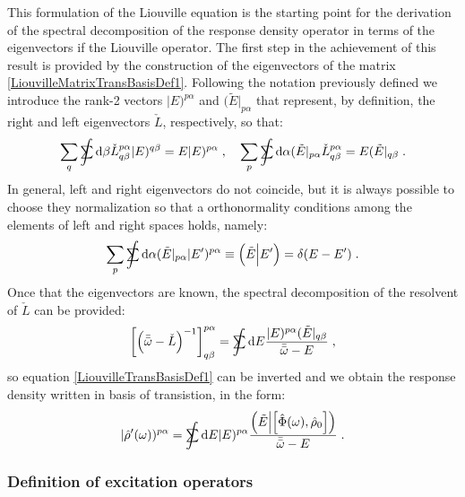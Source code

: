 \documentclass[a4paper]{article}
\newcommand{\dd}{{\rm d}}
\newcommand{\bbomega}{{\bar{\bar\omega}}}
\newcommand{\sint}{\mathrlap{\displaystyle\int}
\mathrlap{\textstyle\sum}
\phantom{\mathrlap{\displaystyle
\int}\textstyle\sum}}
\newcommand{\be}{\begin{equation}}
\newcommand{\ee}{\end{equation}}
\newcommand{\lb}{\label}
\newcommand{\op}[1]{\hat {#1}}
\newcommand{\commutator}[2]{\left[ {#1} , {#2} \right]}
\newcommand{\optr}[1]{\check #1}
\newcommand{\sket}[2]{| #2)^{#1}}
\newcommand{\sbra}[2]{( #2|_{#1}}
\newcommand{\dket}[1]{\Bigl| #1 \Bigr)}
\newcommand{\dbraket}[2]{\Bigl(#1 \Bigl| #2 \Bigr)}
\newcommand{\dmnot}{\op{\rho}_0}
\newcommand{\dm}{\op{\rho}}
\begin{document}
This formulation of the Liouville equation is the starting point for the derivation of the spectral decomposition of the response density operator
in terms of the eigenvectors if the Liouville operator. 
The first step in the achievement of this result is provided by the construction of the eigenvectors of the matrix \eqref{LiouvilleMatrixTransBasisDef1}.
Following the notation previously defined we introduce the rank-2 vectors $\sket{p\alpha}{E}$ and $\sbra{p\alpha}{\tilde E}$ that represent, by definition,
the right and left eigenvectors $\optr{L}$, respectively, so that:
\be\lb{LiouvMatrixEigenvectorDef1}
\sum_q \sint \dd \beta \optr{L}^{p \alpha}_{q\beta} \sket{q \beta}{E} = E \sket{p\alpha}{E} \;, \quad
\sum_p \sint \dd \alpha \sbra{p\alpha}{\tilde E} \optr{L}^{p \alpha}_{q\beta} = E \sbra{q\beta}{\tilde E}\;.
\ee
In general, left and right eigenvectors do not coincide, but it is always possible to choose they normalization so that a orthonormality conditions among the
elements of left and right spaces holds, namely:
\be\lb{ExcitationOrthonormalityDef1}
\sum_p \sint \dd \alpha \sbra{p\alpha}{\tilde E}\sket{p\alpha}{E'} \equiv \dbraket{\tilde E}{E'} = \delta(E-E') \;.
\ee
Once that the eigenvectors are known, the spectral decomposition of the resolvent of $\optr{L}$ can be provided:  
\be
\left[\left(\bbomega-\optr{L}\right)^{-1}\right]^{p\alpha}_{q\beta} =\sint\dd E
\frac{\sket{p\alpha}{E}\sbra{q\beta}{\tilde E}}{\bbomega-E} \;,
\ee
so equation \eqref{LiouvilleTransBasisDef1} can be inverted and we obtain the response density written in basis of transistion, in the form:
\be\lb{RhopExcitationTransBasisDef1}
\sket{p\alpha}{\dm'(\omega)} = 
\sint\dd E \sket{p\alpha}{E}
\frac{\dbraket{\tilde E}{\commutator{\op\Phi(\omega)}{\dmnot}}}{\bbomega-E} \;.
\ee

\subsubsection{Definition of excitation operators}
\end{document}
